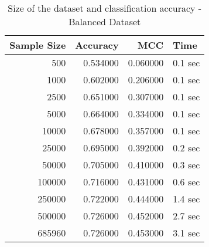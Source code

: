 \begin{table}
\caption{Size of the dataset and classification accuracy - Balanced Dataset}
\label{tab:bal_size}
\begin{tabular}{rrrl}
\toprule
Sample Size & Accuracy & MCC & Time \\
\midrule
500 & 0.534000 & 0.060000 & 0.1 sec \\
1000 & 0.602000 & 0.206000 & 0.1 sec \\
2500 & 0.651000 & 0.307000 & 0.1 sec \\
5000 & 0.664000 & 0.334000 & 0.1 sec \\
10000 & 0.678000 & 0.357000 & 0.1 sec \\
25000 & 0.695000 & 0.392000 & 0.2 sec \\
50000 & 0.705000 & 0.410000 & 0.3 sec \\
100000 & 0.716000 & 0.431000 & 0.6 sec \\
250000 & 0.722000 & 0.444000 & 1.4 sec \\
500000 & 0.726000 & 0.452000 & 2.7 sec \\
685960 & 0.726000 & 0.453000 & 3.1 sec \\
\bottomrule
\end{tabular}
\end{table}
